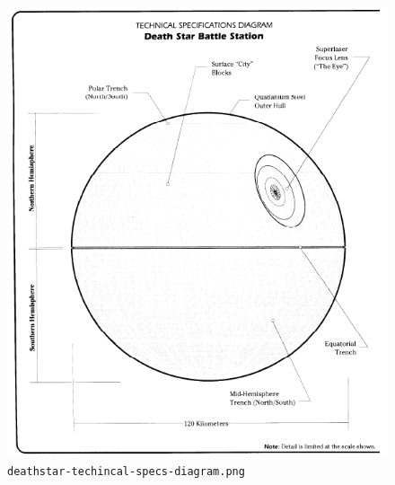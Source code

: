 \documentclass{article}
\begin{document}
\begin{appendices}
\begin{figure}[H]
	\includegraphics[width=\linewidth]{resources/plans/deathstar-technical-specs-diagram.png}
	\caption{\texttt{deathstar-techincal-specs-diagram.png}}
	\label{fig:deathstar_technical_specs_diagram}
\end{figure}


\end{appendices}
\end{document}
